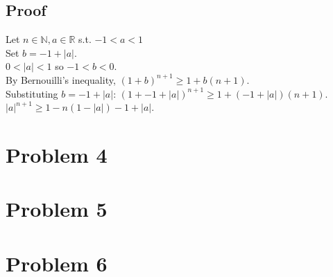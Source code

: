 \documentclass[fleqn,a4paper,12pt]{article}
\begin{document}
\newpage

\subsection{Proof}
Let $n \in \mathbb{N}, a \in \mathbb{R}$ s.t. $-1 < a < 1$ \\
Set $b = -1 + |a|$. \\
$0 < |a| < 1$ so $-1 < b < 0$. \\
By Bernouilli's inequality, $(1+b)^{n+1} \ge 1 + b(n+1)$. \\
Substituting $b = -1 + |a|$: $(1 + -1 + |a|)^{n+1} \ge 1 + (-1+|a|)(n+1)$.\\
$|a|^{n+1} \ge 1 - n(1-|a|) -1 + |a|$. \\

\section{Problem 4}
\section{Problem 5}
\section{Problem 6}
\end{document}
